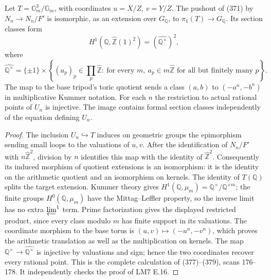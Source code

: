 \begin{proposition}
\label{E-toric}
Let $T=\mathbb G_m^3/\mathbb G_m$, with coordinates
$u=X/Z$, $v=Y/Z$. The pushout of (371) by
$N_n\to N_n/F'$ is isomorphic, as an extension over
$G_{\mathbb Q}$, to $\pi_1(T)\to G_{\mathbb Q}$.
Its section classes form
\[
 H^1(\mathbb Q,\widehat{\mathbb Z}(1)^2)
       =(\widehat{\mathbb Q^\times})^2,
\]
where
\[
 \widehat{\mathbb Q^\times}
 =\{\pm1\}\times
 \left\{(a_p)_p\in\prod_p\widehat{\mathbb Z}:
 \ \text{for every }m,\ a_p\in m\widehat{\mathbb Z}
       \text{ for all but finitely many }p\right\}.
\]
The map to the base tripod's toric quotient sends a class
$(a,b)$ to $(-a^n,-b^n)$ in multiplicative Kummer notation.
For each $n$ the restriction to actual rational points of
$U_n$ is injective. The image contains formal section classes
independently of the equation defining $U_n$.
\end{proposition}
\begin{proof}
The inclusion $U_n\hookrightarrow T$ induces on geometric
groups the epimorphism sending small loops to the valuations
of $u,v$. After the identification of $N_n/F'$ with
$n\widehat{\mathbb Z}^2$, division by $n$ identifies this
map with the identity of $\widehat{\mathbb Z}^2$.
Consequently its induced morphism of quotient extensions
is an isomorphism: it is the identity on the arithmetic
quotient and an isomorphism on kernels. The identity
of $T(\mathbb Q)$ splits the target extension.
Kummer theory gives
$H^1(\mathbb Q,\mu_m)=\mathbb Q^\times/\mathbb Q^{\times m}$;
the finite groups $H^0(\mathbb Q,\mu_m)$ have the
Mittag--Leffler property, so the inverse limit has no
extra $\varprojlim^1$ term. Prime factorization gives the
displayed restricted product, since every class modulo
$m$ has finite support in its valuations.
The coordinate morphism to the base torus is
$(u,v)\mapsto(-u^n,-v^n)$, which proves the arithmetic
translation as well as the multiplication on kernels.
The map $\mathbb Q^\times\to\widehat{\mathbb Q^\times}$
is injective by valuations and sign; hence the two
coordinates recover every rational point. This is the
complete calculation of (377)--(379), scans 176--178.
It independently checks the proof of LM7 E.16.
\end{proof}


